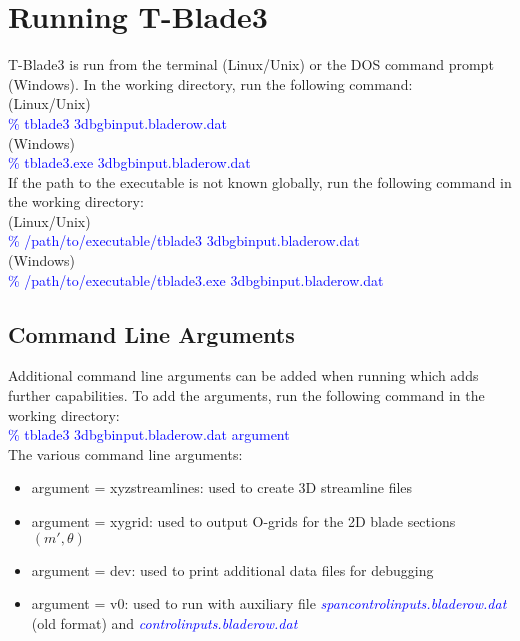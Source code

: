 \documentclass[8pt]{article}
\begin{document}
\section{Running T-Blade3}

\noindent
T-Blade3 is run from the terminal (Linux/Unix) or the DOS command prompt (Windows). In the working directory, run the following command:\\

\noindent
(Linux/Unix)\\
\textcolor{blue}{{\selectfont \% tblade3 3dbgbinput.bladerow.dat}}\\

\noindent
(Windows)\\
\textcolor{blue}{{\selectfont \% tblade3.exe 3dbgbinput.bladerow.dat}}\\

\noindent
If the path to the executable is not known globally, run the following command in the working directory:\\

\noindent
(Linux/Unix)\\
\textcolor{blue}{{\selectfont \% /path/to/executable/tblade3 3dbgbinput.bladerow.dat}}\\

\noindent
(Windows)\\
\textcolor{blue}{{\selectfont \% /path/to/executable/tblade3.exe 3dbgbinput.bladerow.dat}}

\subsection{Command Line Arguments}\label{cmdargs}
\noindent
Additional command line arguments can be added when running which adds further capabilities. To add the arguments, run the following command in the working directory:\\

\noindent
\textcolor{blue}{{\selectfont \% tblade3 3dbgbinput.bladerow.dat argument}}\\

\noindent
The various command line arguments:
\begin{itemize}[leftmargin=*]
    \item argument = {\selectfont xyzstreamlines}: used to create 3D streamline files
    \item argument = {\selectfont xygrid}: used to output O-grids for the 2D blade sections $(m',\theta)$
    \item argument = {\selectfont dev}: used to print additional data files for debugging
    \item argument = {\selectfont v0}: used to run with auxiliary file \textit{\textcolor{blue}{spancontrolinputs.bladerow.dat}} (old format) and \textit{\textcolor{blue}{controlinputs.bladerow.dat}}
\end{itemize}
\end{document}
